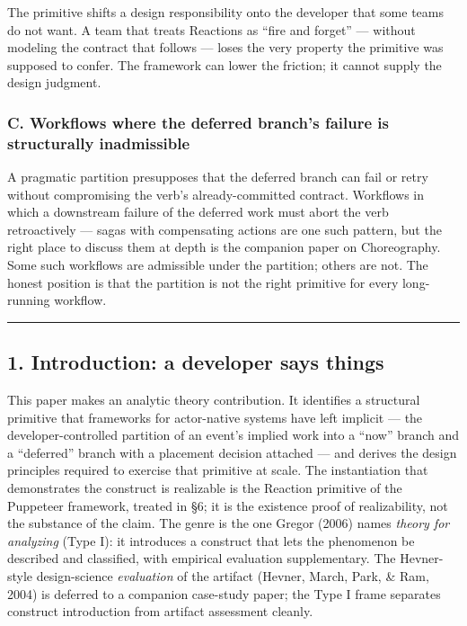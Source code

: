 \documentclass[
]{article}
\begin{document}
The primitive shifts a design responsibility onto the developer that
some teams do not want. A team that treats Reactions as ``fire and
forget'' --- without modeling the contract that follows --- loses the
very property the primitive was supposed to confer. The framework can
lower the friction; it cannot supply the design judgment.

\subsubsection{C. Workflows where the deferred branch's failure is
structurally
inadmissible}\label{c.-workflows-where-the-deferred-branchs-failure-is-structurally-inadmissible}

A pragmatic partition presupposes that the deferred branch can fail or
retry without compromising the verb's already-committed contract.
Workflows in which a downstream failure of the deferred work must abort
the verb retroactively --- sagas with compensating actions are one such
pattern, but the right place to discuss them at depth is the companion
paper on Choreography. Some such workflows are admissible under the
partition; others are not. The honest position is that the partition is
not the right primitive for every long-running workflow.

\begin{center}\rule{0.5\linewidth}{0.5pt}\end{center}

\subsection{1. Introduction: a developer says
things}\label{introduction-a-developer-says-things}

This paper makes an analytic theory contribution. It identifies a
structural primitive that frameworks for actor-native systems have left
implicit --- the developer-controlled partition of an event's implied
work into a ``now'' branch and a ``deferred'' branch with a placement
decision attached --- and derives the design principles required to
exercise that primitive at scale. The instantiation that demonstrates
the construct is realizable is the Reaction primitive of the Puppeteer
framework, treated in §6; it is the existence proof of realizability,
not the substance of the claim. The genre is the one Gregor (2006) names
\emph{theory for analyzing} (Type I): it introduces a construct that
lets the phenomenon be described and classified, with empirical
evaluation supplementary. The Hevner-style design-science
\emph{evaluation} of the artifact (Hevner, March, Park, \& Ram, 2004) is
deferred to a companion case-study paper; the Type I frame separates
construct introduction from artifact assessment cleanly.
\end{document}
